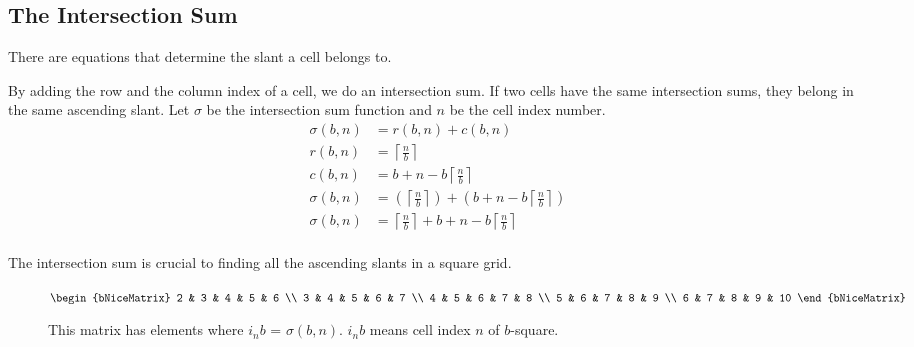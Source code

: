 \documentclass[letterpaper, twoside,12pt]{article}
\begin{document}
    \subsection{The Intersection Sum} \label{intersection_sum}
    There are equations that determine the slant a cell belongs to.

    By adding the row and the column index of a cell, we do an intersection sum. If two cells have the same intersection sums, they belong in the same ascending slant. Let $\sigma$ be the intersection sum function and $n$ be the cell index number.
    \begin{equation}
        \begin{split}
            \sigma(b,n) &= r(b,n) + c(b,n) \\
            r(b,n) &= \left\lceil \frac{n}{b} \right\rceil \\
            c(b,n) &= b + n - b\left\lceil \frac{n}{b} \right\rceil \\
            \sigma(b,n) &= ( \left\lceil \frac{n}{b} \right\rceil ) + (b + n - b\left\lceil \frac{n}{b} \right\rceil)\\
            \sigma(b,n) &= \left\lceil \frac{n}{b} \right\rceil + b + n - b\left\lceil \frac{n}{b} \right\rceil\\
        \end{split}
    \end{equation}

    The intersection sum is crucial to finding all the ascending slants in a square grid.
    \begin{figure}[ht]
        \centering
        {$
        \begin{bNiceMatrix}
            2 & 3 & 4 & 5 & 6 \\
            3 & 4 & 5 & 6 & 7 \\
            4 & 5 & 6 & 7 & 8 \\
            5 & 6 & 7 & 8 & 9 \\
            6 & 7 & 8 & 9 & 10
        \end{bNiceMatrix}
        $}
        \caption{This matrix has elements where $i_{n}b$ = $\sigma(b,n)$. $i_{n}b$ means cell index $n$ of $b$-square.}
    \end{figure}
\end{document}
